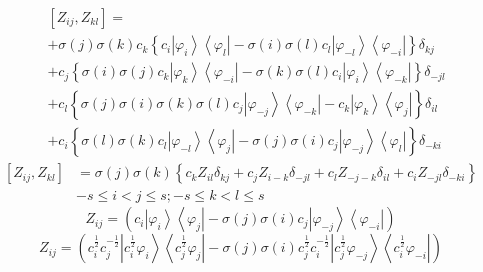 \documentclass[aps,preprint]{revtex4}%
\begin{document}
\begin{align}
&  \left[  Z_{ij},Z_{kl}\right]  =\\
&  +\sigma\left(  j\right)  \sigma\left(  k\right)  c_{k}\left\{
c_{i}\left\vert \varphi_{i}\right\rangle \left\langle \varphi_{l}\right\vert
-\sigma\left(  i\right)  \sigma\left(  l\right)  c_{l}\left\vert \varphi
_{-l}\right\rangle \left\langle \varphi_{-i}\right\vert \right\}  \delta
_{kj}\\
&  +c_{j}\left\{  \sigma\left(  i\right)  \sigma\left(  j\right)
c_{k}\left\vert \varphi_{k}\right\rangle \left\langle \varphi_{-i}\right\vert
-\sigma\left(  k\right)  \sigma\left(  l\right)  c_{i}\left\vert \varphi
_{i}\right\rangle \left\langle \varphi_{-k}\right\vert \right\}  \delta
_{-jl}\\
&  +c_{l}\left\{  \sigma\left(  j\right)  \sigma\left(  i\right)
\sigma\left(  k\right)  \sigma\left(  l\right)  c_{j}\left\vert \varphi
_{-j}\right\rangle \left\langle \varphi_{-k}\right\vert -c_{k}\left\vert
\varphi_{k}\right\rangle \left\langle \varphi_{j}\right\vert \right\}
\delta_{il}\\
&  +c_{i}\left\{  \sigma\left(  l\right)  \sigma\left(  k\right)
c_{l}\left\vert \varphi_{-l}\right\rangle \left\langle \varphi_{j}\right\vert
-\sigma\left(  j\right)  \sigma\left(  i\right)  c_{j}\left\vert \varphi
_{-j}\right\rangle \left\langle \varphi_{l}\right\vert \right\}  \delta_{-ki}%
\end{align}%
\begin{align}
\left[  Z_{ij},Z_{kl}\right]   &  =\sigma\left(  j\right)  \sigma\left(
k\right)  \left\{  c_{k}Z_{il}\delta_{kj}+c_{j}Z_{i-k}\delta_{-jl}%
+c_{l}Z_{-j-k}\delta_{il}+c_{i}Z_{-jl}\delta_{-ki}\right\}  \\
&  -s\leq i<j\leq s;-s\leq k<l\leq s
\end{align}%
\begin{equation}
Z_{ij}=\left(  c_{i}\left\vert \varphi_{i}\right\rangle \left\langle
\varphi_{j}\right\vert -\sigma\left(  j\right)  \sigma\left(  i\right)
c_{j}\left\vert \varphi_{-j}\right\rangle \left\langle \varphi_{-i}\right\vert
\right)
\end{equation}%
\begin{equation}
Z_{ij}=\left(  c_{i}^{\frac{1}{2}}c_{j}^{-\frac{1}{2}}\left\vert c_{i}%
^{\frac{1}{2}}\varphi_{i}\right\rangle \left\langle c_{j}^{\frac{1}{2}}%
\varphi_{j}\right\vert -\sigma\left(  j\right)  \sigma\left(  i\right)
c_{j}^{\frac{1}{2}}c_{i}^{-\frac{1}{2}}\left\vert c_{j}^{\frac{1}{2}}%
\varphi_{-j}\right\rangle \left\langle c_{i}^{\frac{1}{2}}\varphi
_{-i}\right\vert \right)
\end{equation}%
\end{document}
